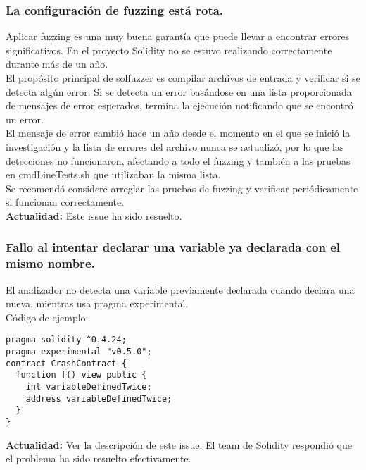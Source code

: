 \subsubsection{La configuración de fuzzing está rota.}

Aplicar fuzzing es una muy buena garantía que puede llevar a encontrar errores significativos. En el proyecto Solidity no se estuvo realizando correctamente durante más de un año.\\

El propósito principal de solfuzzer es compilar archivos de entrada y verificar si se detecta algún error. Si se detecta un error basándose en una lista proporcionada de mensajes de error esperados, termina la ejecución notificando que se encontró un error.\\

El mensaje de error cambió hace un año desde el momento en el que se inició la investigación y la lista de errores del archivo nunca se actualizó, por lo que las detecciones no funcionaron, afectando a todo el fuzzing y también a las pruebas en cmdLineTests.sh que utilizaban la misma lista.\\

Se recomendó considere arreglar las pruebas de fuzzing y verificar periódicamente si funcionan correctamente.\\

\textbf{Actualidad:} Este issue ha sido resuelto.


\subsubsection{Fallo al intentar declarar una variable ya declarada con el mismo nombre.}

El analizador no detecta una variable previamente declarada cuando declara una nueva, mientras usa pragma experimental.\\

Código de ejemplo:
\begin{lstlisting}[language=Solidity]
pragma solidity ^0.4.24;
pragma experimental "v0.5.0";
contract CrashContract {     
  function f() view public {
    int variableDefinedTwice;
    address variableDefinedTwice;
  }
}
\end{lstlisting}

\textbf{Actualidad:} Ver la descripción de este issue. El team de Solidity respondió que el problema ha sido resuelto efectivamente.\\

